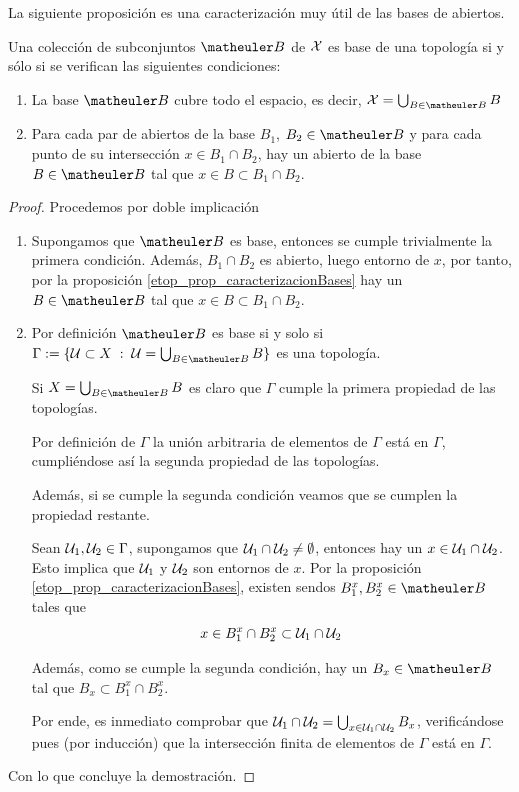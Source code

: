 La siguiente proposición es una caracterización muy útil de las bases de abiertos.
\begin{prop}
	\label{etop_base_top}
	Una colección de subconjuntos $\B$ de $\mathcal{X}$ es base de una topología si y sólo si se verifican las siguientes condiciones:
	\begin{enumerate}
		\item La base $\B$ cubre todo el espacio, es decir, $\X = \bigcup_{B \in \B}B$
		\item Para cada par de abiertos de la base $B_1$, $B_2 \in \B$ y para cada punto de su intersección $x \in B_1 \cap B_2$,  hay un abierto de la base $B \in \B$ tal que $x\in B \subset B_1 \cap B_2$.
	\end{enumerate}
\end{prop}
\begin{proof}Procedemos por doble implicación
	\begin{enumerate}
		\item[\bra] Supongamos que $\B$ es base, entonces se cumple trivialmente la primera condición. Además, $B_1 \cap B_2$ es abierto, luego entorno de $x$, por tanto, por la proposición \ref{etop_prop_caracterizacionBases} hay un $B\in\B$ tal que $x \in B \subset B_1 \cap B_2$.
		
		\item[\bla] Por definición $\B$ es base si y solo si $\Gamma:=\{ \U \subset X \midc \U = \bigcup_{B \in \B}B\}$ es una topología.
		
		Si $X = \bigcup_{B \in \B}B$ es claro que $\Gamma$ cumple la primera propiedad de las topologías.
		
		Por definición de $\Gamma$ la unión arbitraria de elementos de $\Gamma$ está en $\Gamma$, cumpliéndose así la segunda propiedad de las topologías.
		
		Además, si se cumple la segunda condición veamos que se cumplen la propiedad restante.
		
		Sean $\mathcal{U}_1, \mathcal{U}_2 \in \Gamma$, supongamos que $\mathcal{U}_1 \cap \mathcal{U}_2 \not= \emptyset$, entonces hay un $x \in \mathcal{U}_1 \cap \mathcal{U}_2$. Esto implica que $\mathcal{U}_1$ y $\mathcal{U}_2$ son entornos de $x$. Por la proposición \ref{etop_prop_caracterizacionBases}, existen sendos $B_1^x, B_2^x\in\B$ tales que \[x \in B_1^x \cap B_2^x \subset \mathcal{U}_1 \cap \mathcal{U}_2\]
		
		Además, como se cumple la segunda condición, hay un $B_x\in\B$ tal que $B_x\subset B_1^x\cap B_2^x$.
		
		Por ende, es inmediato comprobar que $\mathcal{U}_1\cap\mathcal{U}_2=\bigcup_{x\in\mathcal{U}_1\cap\mathcal{U}_2}B_x$, verificándose pues (por inducción) que la intersección finita de elementos de $\Gamma$ está en $\Gamma$.
	\end{enumerate}
	Con lo que concluye la demostración.
\end{proof}
